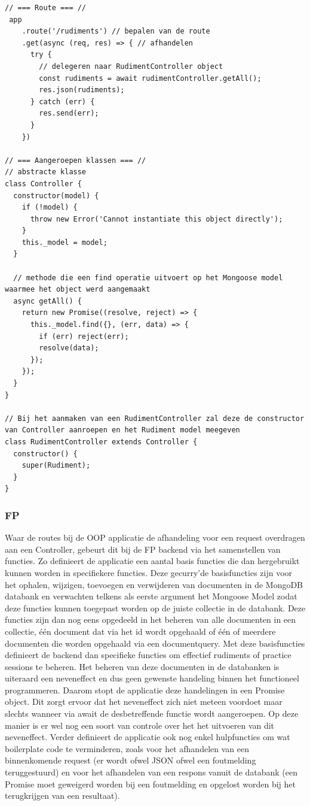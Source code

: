 \begin{lstlisting}[caption=Afhandelen van de rudiments route - OOP]
// === Route === //
 app
    .route('/rudiments') // bepalen van de route
    .get(async (req, res) => { // afhandelen
      try {
        // delegeren naar RudimentController object
        const rudiments = await rudimentController.getAll();
        res.json(rudiments);
      } catch (err) {
        res.send(err);
      }
    })

// === Aangeroepen klassen === //
// abstracte klasse 
class Controller {
  constructor(model) {
    if (!model) {
      throw new Error('Cannot instantiate this object directly');
    }
    this._model = model;
  }

  // methode die een find operatie uitvoert op het Mongoose model waarmee het object werd aangemaakt
  async getAll() {
    return new Promise((resolve, reject) => {
      this._model.find({}, (err, data) => {
        if (err) reject(err);
        resolve(data);
      });
    });
  }
}

// Bij het aanmaken van een RudimentController zal deze de constructor van Controller aanroepen en het Rudiment model meegeven
class RudimentController extends Controller {
  constructor() {
    super(Rudiment);
  }
}
\end{lstlisting}

\subsubsection{FP}
Waar de routes bij de OOP applicatie de afhandeling voor een request overdragen aan een Controller, gebeurt dit bij de FP backend via het samenstellen van functies. Zo definieert de applicatie een aantal basis functies die dan hergebruikt kunnen worden in specifiekere functies. Deze gecurry'de basisfuncties zijn voor het ophalen, wijzigen, toevoegen en verwijderen van documenten in de MongoDB databank en verwachten telkens als eerste argument het Mongoose Model zodat deze functies kunnen toegepast worden op de juiste collectie in de databank. Deze functies zijn dan nog eens opgedeeld in het beheren van alle documenten in een collectie, één document dat via het id wordt opgehaald of één of meerdere documenten die worden opgehaald via een documentquery. Met deze basisfuncties definieert de backend dan specifieke functies om effectief rudiments of practice sessions te beheren. Het beheren van deze documenten in de databanken is uiteraard een neveneffect en dus geen gewenste handeling binnen het functioneel programmeren. Daarom stopt de applicatie deze handelingen in een Promise object. Dit zorgt ervoor dat het neveneffect zich niet meteen voordoet maar slechts wanneer via await de desbetreffende functie wordt aangeroepen. Op deze manier is er wel nog een soort van controle over het het uitvoeren van dit neveneffect. Verder definieert de applicatie ook nog enkel hulpfuncties om wat boilerplate code te verminderen, zoals voor het afhandelen van een binnenkomende request (er wordt ofwel JSON ofwel een foutmelding teruggestuurd) en voor het afhandelen van een respons vanuit de databank (een Promise moet geweigerd worden bij een foutmelding en opgelost worden bij het terugkrijgen van een resultaat).

